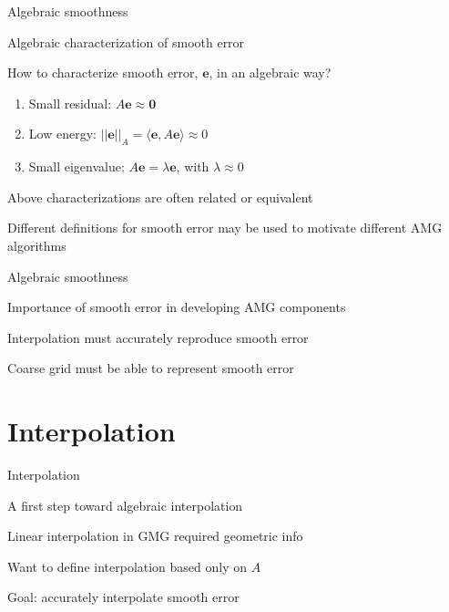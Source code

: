 \documentclass[18pt,xcolor=table]{beamer}
\begin{document}
\begin{frame}{Algebraic smoothness}
\begin{block}{Algebraic characterization of smooth error}
\bit
\item How to characterize smooth error, $\mathbf{e}$, in an algebraic way?
\begin{enumerate}
   \item Small residual: $A\mathbf{e} \approx \mathbf{0}$
   \item Low energy: $||\mathbf{e}||_A = \langle \mathbf{e}, A\mathbf{e} \rangle \approx 0$
   \item Small eigenvalue: $A\mathbf{e} = \lambda\mathbf{e}$, with $\lambda \approx 0$
\end{enumerate}
\item Above characterizations are often related or equivalent
\item Different definitions for smooth error may be used to motivate different AMG algorithms
\eit
\end{block}
\end{frame}

\begin{frame}{Algebraic smoothness}
\begin{block}{Importance of smooth error in developing AMG components}
\bit
\item Interpolation must accurately reproduce smooth error
\item Coarse grid must be able to represent smooth error
\eit
\end{block}
\end{frame}


\section{Interpolation}

\begin{frame}{Interpolation}
\begin{block}{A first step toward algebraic interpolation}
\bit
\item Linear interpolation in GMG required geometric info
\item Want to define interpolation based only on $A$
\item Goal: accurately interpolate smooth error
\eit
\end{block}
\end{frame}
\end{document}
